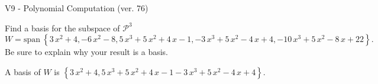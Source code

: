 \begin{exercise}
  \begin{exerciseTitle}V9 - Polynomial Computation (ver. 76)\end{exerciseTitle}
  \begin{exerciseStatement}
    Find a basis for the subspace of \(\mathcal{P}^3\) 
\[W=\mathrm{span}\ \left\{3 \, x^{2} + 4 , -6 \, x^{2} - 8 , 5 \, x^{3} + 5 \, x^{2} + 4 \, x - 1 , -3 \, x^{3} + 5 \, x^{2} - 4 \, x + 4 , -10 \, x^{3} + 5 \, x^{2} - 8 \, x + 22\right\}.\]
 Be sure to explain why your result is a basis.


  \end{exerciseStatement}
  \begin{exerciseAnswer}
   A basis of \(W\) is  \(\left\{3 \, x^{2} + 4 , 5 \, x^{3} + 5 \, x^{2} + 4 \, x - 1 -3 \, x^{3} + 5 \, x^{2} - 4 \, x + 4\right\}\).
  


  \end{exerciseAnswer}
\end{exercise}